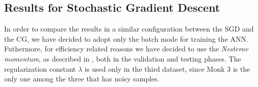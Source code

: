         \subsection{Results for Stochastic Gradient Descent} %
        \label{sub:results_for_stochastic_gradient_descent}

            \begin{table}[H]
                \centering
                \begin{subtable}{\textwidth}
                \end{subtable}
                \caption{Results for the Stochastic Gradient Descent.}
                \label{tab:monks_sgd}
            \end{table}

           In order to compare the results in a similar configuration between the SGD and the CG, we have decided to adopt only the batch mode for training the ANN.
            Futhermore, for efficiency related reasons we have decided to use the \textit{Nesterov momentum}, as
            described in \cite{Goodfellow-et-al-2016,Sutskever:2013:IIM:3042817.3043064}, both in the
            validation and testing phases. The regularization constant $\lambda$ is used only in the third
            dataset, since Monk 3 is the only one among the three that has noisy samples.


